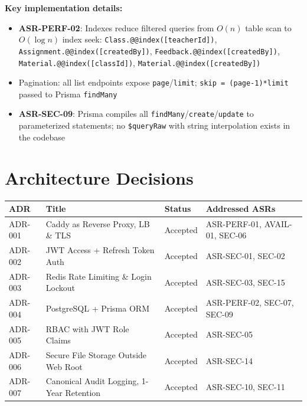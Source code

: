 \documentclass[12pt,a4paper]{article}
\begin{document}
\textbf{Key implementation details:}
\begin{itemize}[noitemsep]
  \item \textbf{ASR-PERF-02}: Indexes reduce filtered queries from $O(n)$ table scan to $O(\log n)$ index seek:
    \texttt{Class.@@index([teacherId])},
    \texttt{Assignment.@@index([createdBy])},
    \texttt{Feedback.@@index([createdBy])},
    \texttt{Material.@@index([classId])},
    \texttt{Material.@@index([createdBy])}
  \item Pagination: all list endpoints expose \texttt{page}/\texttt{limit}; \texttt{skip = (page-1)*limit} passed to Prisma \texttt{findMany}
  \item \textbf{ASR-SEC-09}: Prisma compiles all \texttt{findMany}/\texttt{create}/\texttt{update} to parameterized statements; no \texttt{\$queryRaw} with string interpolation exists in the codebase
\end{itemize}

\section{Architecture Decisions}
\label{sec:adr}

\begin{tabularx}{\textwidth}{L{1.8cm} L{5cm} L{1.8cm} L{5cm}}
  \toprule
  \textbf{ADR} & \textbf{Title} & \textbf{Status} & \textbf{Addressed ASRs} \\
  \midrule
  ADR-001 & Caddy as Reverse Proxy, LB \& TLS  & Accepted & ASR-PERF-01, AVAIL-01, SEC-06 \\
  ADR-002 & JWT Access + Refresh Token Auth     & Accepted & ASR-SEC-01, SEC-02 \\
  ADR-003 & Redis Rate Limiting \& Login Lockout & Accepted & ASR-SEC-03, SEC-15 \\
  ADR-004 & PostgreSQL + Prisma ORM             & Accepted & ASR-PERF-02, SEC-07, SEC-09 \\
  ADR-005 & RBAC with JWT Role Claims           & Accepted & ASR-SEC-05 \\
  ADR-006 & Secure File Storage Outside Web Root & Accepted & ASR-SEC-14 \\
  ADR-007 & Canonical Audit Logging, 1-Year Retention & Accepted & ASR-SEC-10, SEC-11 \\
  \bottomrule
\end{tabularx}
\end{document}
